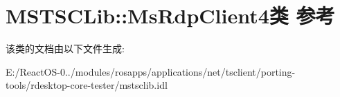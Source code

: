 \hypertarget{class_m_s_t_s_c_lib_1_1_ms_rdp_client4}{}\section{M\+S\+T\+S\+C\+Lib\+:\+:Ms\+Rdp\+Client4类 参考}
\label{class_m_s_t_s_c_lib_1_1_ms_rdp_client4}


该类的文档由以下文件生成\+:\begin{DoxyCompactItemize}
\item 
E\+:/\+React\+O\+S-\/0../modules/rosapps/applications/net/tsclient/porting-\/tools/rdesktop-\/core-\/tester/mstsclib.\+idl\end{DoxyCompactItemize}
